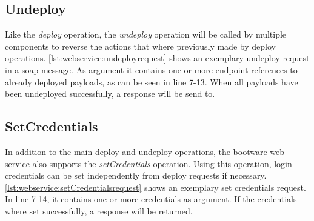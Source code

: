 \subsection{Undeploy}

Like the \textit{deploy} operation, the \textit{undeploy} operation will be called by multiple components to reverse the actions that where previously made by deploy operations.
\autoref{lst:webservice:undeployrequest} shows an exemplary undeploy request in a soap message.
As argument it contains one or more endpoint references to already deployed payloads, as can be seen in line 7-13.
When all payloads have been undeployed successfully, a response will be send to.

\vspace*{\baselineskip}

\vspace*{\baselineskip}

\subsection{SetCredentials}

In addition to the main deploy and undeploy operations, the bootware web service also supports the \textit{setCredentials} operation.
Using this operation, login credentials can be set independently from deploy requests if necessary.
\autoref{lst:webservice:setCredentialsrequest} shows an exemplary set credentials request.
In line 7-14, it contains one or more credentials as argument.
If the credentials where set successfully, a response will be returned.

\vspace*{\baselineskip}

